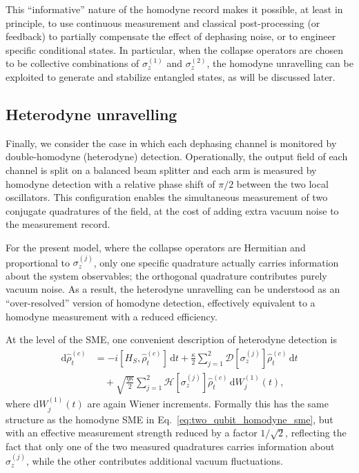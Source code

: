 This “informative” nature of the homodyne record makes it possible, at least in principle, to use continuous measurement and classical post-processing (or feedback) to partially compensate the effect of dephasing noise, or to engineer specific conditional states.  
In particular, when the collapse operators are chosen to be collective combinations of $\sigma_z^{(1)}$ and $\sigma_z^{(2)}$, the homodyne unravelling can be exploited to generate and stabilize entangled states, as will be discussed later.

\subsection{Heterodyne unravelling}
\label{subsec:two_qubit_heterodyne}

Finally, we consider the case in which each dephasing channel is monitored by double-homodyne (heterodyne) detection.  
Operationally, the output field of each channel is split on a balanced beam splitter and each arm is measured by homodyne detection with a relative phase shift of $\pi/2$ between the two local oscillators.  
This configuration enables the simultaneous measurement of two conjugate quadratures of the field, at the cost of adding extra vacuum noise to the measurement record.

For the present model, where the collapse operators are Hermitian and proportional to $\sigma_z^{(j)}$, only one specific quadrature actually carries information about the system observables; the orthogonal quadrature contributes purely vacuum noise.  
As a result, the heterodyne unravelling can be understood as an ``over-resolved'' version of homodyne detection, effectively equivalent to a homodyne measurement with a reduced efficiency.

At the level of the SME, one convenient description of heterodyne detection is
\begin{equation}
	\begin{aligned}
		\mathrm{d}\hat{\rho}_t^{(c)}
		&= - i [H_S, \hat{\rho}_t^{(c)}]\, \mathrm{d}t
		+ \frac{\kappa}{2}\sum_{j=1}^{2} 
		\mathcal{D}[\sigma_z^{(j)}]\hat{\rho}_t^{(c)} \,\mathrm{d}t \\
		&\quad + \sqrt{\frac{\eta\kappa}{2}} \sum_{j=1}^{2}
		\mathcal{H}[\sigma_z^{(j)}]\hat{\rho}_t^{(c)} \,\mathrm{d}W_j^{(1)}(t),
	\end{aligned}
	\label{eq:two_qubit_heterodyne_sme}
\end{equation}
where $\mathrm{d}W_j^{(1)}(t)$ are again Wiener increments.  
Formally this has the same structure as the homodyne SME in Eq.~\eqref{eq:two_qubit_homodyne_sme}, but with an effective measurement strength reduced by a factor $1/\sqrt{2}$, reflecting the fact that only one of the two measured quadratures carries information about $\sigma_z^{(j)}$, while the other contributes additional vacuum fluctuations.

